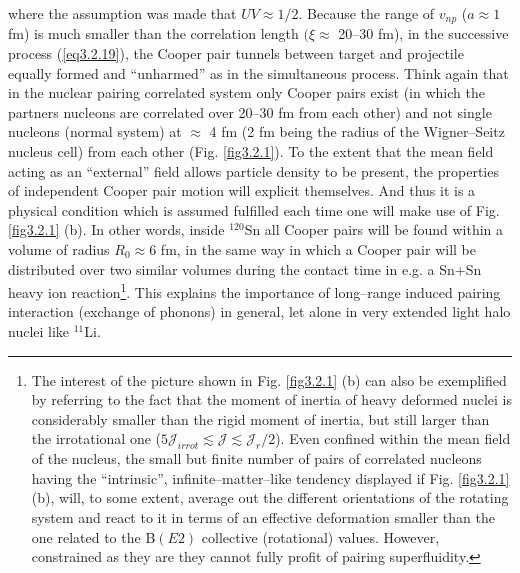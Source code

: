 where the assumption was made that $UV\approx1/2$. Because the range of $v_{np}$ ($a\approx 1$ fm) is much smaller than the correlation length $(\xi\approx$ 20--30 fm), in the successive process (\ref{eq3.2.19}), the Cooper pair tunnels between target and projectile equally formed and ``unharmed'' as in the simultaneous process. Think again that in the nuclear pairing correlated system only Cooper pairs exist  (in which the partners nucleons are correlated over 20--30 fm from each other) and not single nucleons (normal system)  at $\approx$ 4 fm (2 fm being the radius of the Wigner--Seitz nucleus cell) from each other (Fig. \ref{fig3.2.1}). To the extent that the mean field acting as an ``external'' field allows particle density to be present, the properties of independent Cooper pair motion will explicit themselves. And thus it is a physical condition which is assumed fulfilled each time one will make use of Fig. \ref{fig3.2.1} (b). In other words, inside $^{120}$Sn all Cooper pairs will be found within a volume of radius $R_0\approx 6$ fm, in the same way in which a Cooper pair will be distributed over two similar volumes during the contact time  in e.g. a Sn+Sn heavy ion reaction\footnote{The interest of the  picture shown in Fig. \ref{fig3.2.1} (b) can also be exemplified by referring to the fact that the moment of inertia of heavy deformed nuclei is considerably smaller than the rigid moment of inertia, but still larger than the irrotational one ($5\mathcal J_{irrot}\lesssim\mathcal J\lesssim  \mathcal J_r/2$). Even confined within the mean field of the nucleus, the small but finite number of pairs of correlated nucleons having the ``intrinsic'', infinite--matter--like tendency displayed if Fig. \ref{fig3.2.1} (b), will, to some extent, average out the different orientations of the rotating system and react to it in terms of an effective deformation smaller than the one related to the B$(E2)$ collective (rotational) values. However, constrained as they are they cannot fully profit of pairing superfluidity.}.  This explains the importance of long--range induced pairing interaction (exchange of phonons) in general, let alone in very extended light halo nuclei like $^{11}$Li.

